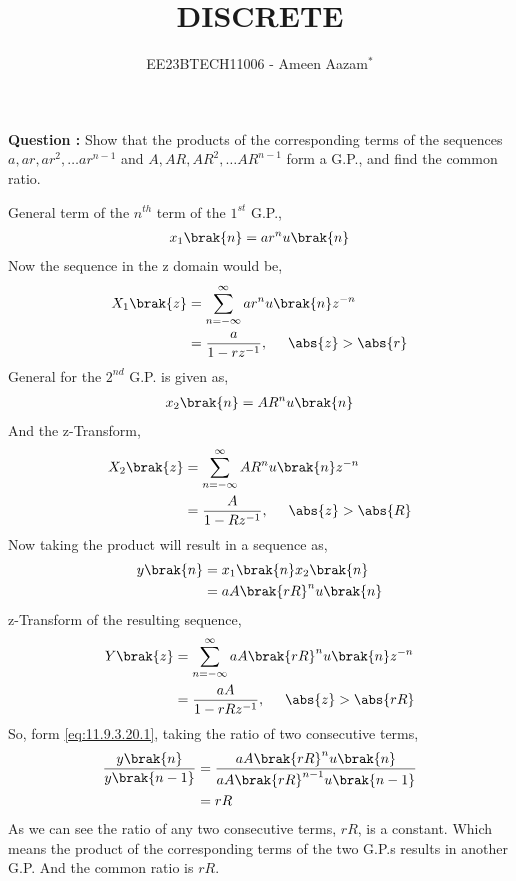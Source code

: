 \documentclass[journal,12pt,twocolumn]{IEEEtran}
\theoremstyle{remark}
\begin{document}

\vspace{3cm}

\title{DISCRETE}
\author{EE23BTECH11006 - Ameen Aazam$^{*}$%
}
\maketitle
\newpage
\bigskip

\renewcommand{\thefigure}{\theenumi}
\renewcommand{\thetable}{\theenumi}

\vspace{3cm}
\textbf{Question :}
Show that the products of the corresponding terms of the sequences $a, ar, ar^2, \ldots ar^{n-1}$ and $A, AR, AR^2, \ldots AR^{n-1}$ form a G.P., and find the common ratio.

\solution
\fi

General term of the $n^{th}$ term of the $1^{st}$ G.P.,
\begin{align}
    x_1\brak{n}=ar^nu\brak{n}
\end{align}
Now the sequence in the z domain would be,
\begin{align}
    X_1\brak{z}&=\sum\limits_{n=-\infty}^{\infty}ar^nu\brak{n}z^{-n} \\
    &=\frac{a}{1-rz^{-1}},\hspace{0.5cm}\abs{z}>\abs{r}
\end{align}
General for the $2^{nd}$ G.P. is given as,
\begin{align}
    x_2\brak{n}=AR^nu\brak{n}
\end{align}
And the z-Transform,
\begin{align}
    X_2\brak{z}&=\sum\limits_{n=-\infty}^{\infty}AR^nu\brak{n}z^{-n} \\
    &=\frac{A}{1-Rz^{-1}},\hspace{0.5cm}\abs{z}>\abs{R}
\end{align}
Now taking the product will result in a sequence as,
\begin{align}
    y\brak{n}&=x_1\brak{n}x_2\brak{n} \\
    &=aA\brak{rR}^nu\brak{n} \label{eq:11.9.3.20.1}
\end{align}
z-Transform of the resulting sequence,
\begin{align}
    Y\brak{z}&=\sum\limits_{n=-\infty}^{\infty}aA\brak{rR}^nu\brak{n}z^{-n} \\
    &=\frac{aA}{1-rRz^{-1}},\hspace{0.5cm}\abs{z}>\abs{rR}
\end{align}
So, form \ref{eq:11.9.3.20.1}, taking the ratio of two consecutive terms,
\begin{align}
    \frac{y\brak{n}}{y\brak{n-1}}&=\frac{aA\brak{rR}^nu\brak{n}}{aA\brak{rR}^{n-1}u\brak{n-1}} \\
    &=rR
\end{align}
As we can see the ratio of any two consecutive terms, $rR$, is a constant. Which means the product of the corresponding terms of the two G.P.s results in another G.P.
And the common ratio is $rR$.
\end{document}
